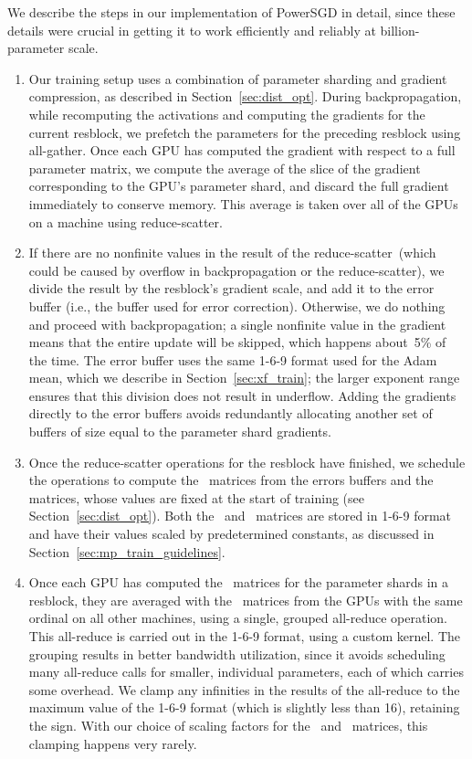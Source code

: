 \documentclass{article}
\begin{document}
We describe the steps in our implementation of PowerSGD in detail, since these details were crucial in getting it to work efficiently and reliably at billion-parameter scale.
\begin{enumerate}
    \item Our training setup uses a combination of parameter sharding and gradient compression, as described in Section~\ref{sec:dist_opt}. During backpropagation, while recomputing the activations and computing the gradients for the current resblock, we prefetch the parameters for the preceding resblock using all-gather. Once each GPU has computed the gradient with respect to a full parameter matrix, we compute the average of the slice of the gradient corresponding to the GPU's parameter shard, and discard the full gradient immediately to conserve memory. This average is taken over all of the GPUs on a machine using reduce-scatter.
    \item If there are no nonfinite values in the result of the reduce-scatter~(which could be caused by overflow in backpropagation or the reduce-scatter), we divide the result by the resblock's gradient scale, and add it to the error buffer (i.e., the buffer used for error correction). Otherwise, we do nothing and proceed with backpropagation; a single nonfinite value in the gradient means that the entire update will be skipped, which happens about~5\% of the time. The error buffer uses the same 1-6-9 format used for the Adam mean, which we describe in Section~\ref{sec:xf_train}; the larger exponent range ensures that this division does not result in underflow. Adding the gradients directly to the error buffers avoids redundantly allocating another set of buffers of size equal to the parameter shard gradients.
    \item Once the reduce-scatter operations for the resblock have finished, we schedule the operations to compute the~ matrices from the errors buffers and the~ matrices, whose values are fixed at the start of training (see Section~\ref{sec:dist_opt}). Both the~ and~ matrices are stored in 1-6-9 format and have their values scaled by predetermined constants, as discussed in Section~\ref{sec:mp_train_guidelines}.
    \item Once each GPU has computed the~ matrices for the parameter shards in a resblock, they are averaged with the~ matrices from the GPUs with the same ordinal on all other machines, using a single, grouped all-reduce operation. This all-reduce is carried out in the 1-6-9 format, using a custom kernel. The grouping results in better bandwidth utilization, since it avoids scheduling many all-reduce calls for smaller, individual parameters, each of which carries some overhead. We clamp any infinities in the results of the all-reduce to the maximum value of the 1-6-9 format (which is slightly less than 16), retaining the sign. With our choice of scaling factors for the~ and~ matrices, this clamping happens very rarely.

\end{enumerate}
\end{document}
